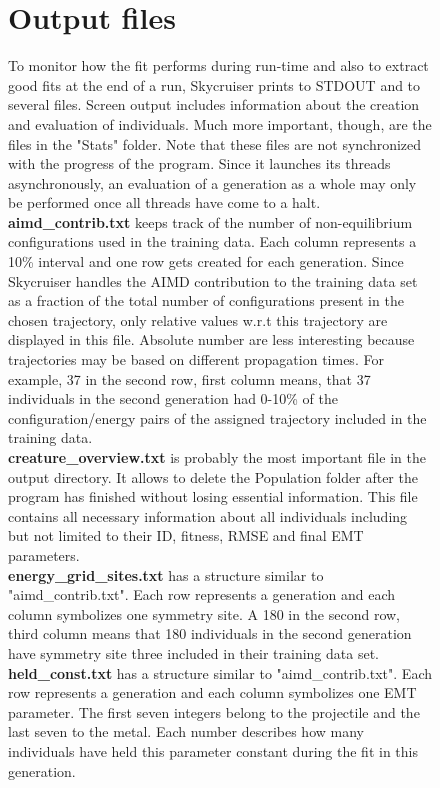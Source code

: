 \documentclass[twoside, 11pt, titlepage, captions=nooneline, a4paper, headsepline]{scrbook}%
\newcommand{\9}{\mathrm}
\newcommand{\0}{\,\mathrm}
\begin{document}
\begin{figure}[b!]
\section{Output files}
To monitor how the fit performs during run-time and also to extract good fits at the end of a run, Skycruiser prints to STDOUT and to several files. Screen output includes information about the creation and evaluation of individuals. Much more important, though, are the files in the "Stats" folder. Note that these files are not synchronized with the progress of the program. Since it launches its threads asynchronously, an evaluation of a generation as a whole may only be performed once all threads have come to a halt.\\
\textbf{aimd\_contrib.txt} keeps track of the number of non-equilibrium configurations used in the training data. Each column represents a 10\% interval and one row gets created for each generation. Since Skycruiser handles the AIMD contribution to the training data set as a fraction of the total number of configurations present in the chosen trajectory, only relative values w.r.t this trajectory are displayed in this file. Absolute number are less interesting because trajectories may be based on different propagation times. For example, 37 in the second row, first column means, that 37 individuals in the second generation had 0-10\% of the configuration/energy pairs of the assigned trajectory included in the training data.\\
\textbf{creature\_overview.txt} is probably the most important file in the output directory. It allows to delete the Population folder after the program has finished without losing essential information. This file contains all necessary information about all individuals including but not limited to their ID, fitness, RMSE and final EMT parameters.\\
\textbf{energy\_grid\_sites.txt} has a structure similar to "aimd\_contrib.txt". Each row represents a generation and each column symbolizes one symmetry site. A 180 in the second row, third column means that 180 individuals in the second generation have symmetry site three included in their training data set.\\
\textbf{held\_const.txt} has a structure similar to "aimd\_contrib.txt". Each row represents a generation and each column symbolizes one EMT parameter. The first seven integers belong to the projectile and the last seven to the metal. Each number describes how many individuals have held this parameter constant during the fit in this generation.\\

\end{figure}
\end{document}
